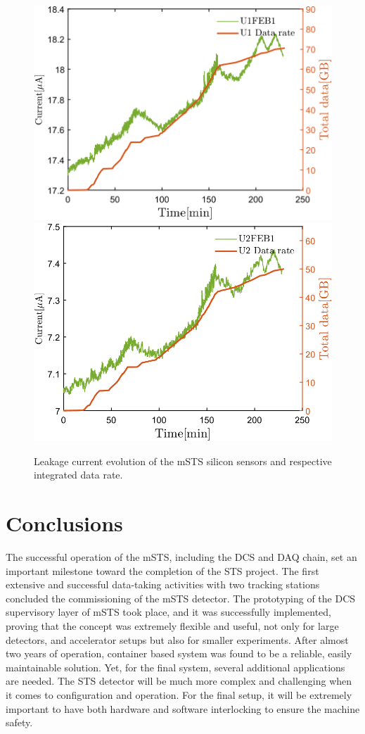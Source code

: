 \begin{figure}[!h]
\centering
\includegraphics[width=0.48\columnwidth]{Chapter6/DCS/images/U1_data_rate.png}
\includegraphics[width=0.48\columnwidth]{Chapter6/DCS/images/U2_data_rate.png}
\caption{Leakage current evolution of the \gls{mSTS} silicon sensors and respective integrated data rate.}
\label{fig_Data}
\end{figure}

\section{Conclusions}

The successful operation of the \gls{mSTS}, including the \gls{DCS} and \gls{DAQ} chain, set an important milestone toward the completion of the \gls{STS} project. The first extensive and successful data-taking activities with two tracking stations concluded the commissioning of the \gls{mSTS} detector. The prototyping of the \gls{DCS} supervisory layer of \gls{mSTS} took place, and it was successfully implemented, proving that the concept was extremely flexible and useful, not only for large detectors, and accelerator setups but also for smaller experiments. After almost two years of operation, container based system was found to be a reliable, easily maintainable solution. Yet, for the final system, several additional applications are needed. The \gls{STS} detector will be much more complex and challenging when it comes to configuration and operation. For the final setup, it will be extremely important to have both hardware and software interlocking to ensure the machine safety.

